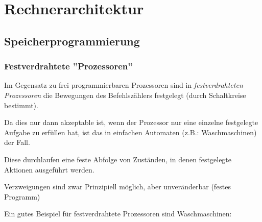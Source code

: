 \documentclass[12pt]{report}
\begin{document}






\chapter{Rechnerarchitektur}

\section{Speicherprogrammierung}
\subsection{Festverdrahtete ''Prozessoren''}
\begin{defbox}
  Im Gegensatz zu frei programmierbaren Prozessoren sind in \textit{festverdrahteten Prozessoren} die Bewegungen
  des Befehlszählers festgelegt (durch Schaltkreise bestimmt).
  
  Da dies nur dann akzeptable ist, wenn der Prozessor nur eine einzelne festgelegte Aufgabe zu erfüllen hat, ist das 
  in einfachen Automaten (z.B.: Waschmaschinen) der Fall.
  
  Diese durchlaufen eine feste Abfolge von Zuständen, in denen festgelegte Aktionen ausgeführt werden.
  
  Verzweigungen sind zwar Prinzipiell möglich, aber unveränderbar (festes Programm)
\end{defbox}
Ein gutes Beispiel für festverdrahtete Prozessoren sind Waschmaschinen:
\end{document}
